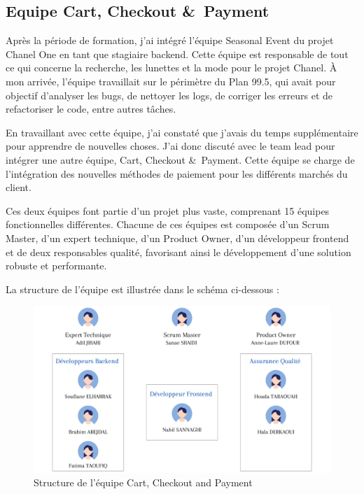 \subsection{Equipe Cart, Checkout \&\ Payment}

Après la période de formation, j'ai intégré l'équipe Seasonal Event du projet Chanel One en tant que stagiaire backend. Cette équipe est responsable de tout ce qui concerne la recherche, les lunettes et la mode pour le projet Chanel. À mon arrivée, l'équipe travaillait sur le périmètre du Plan 99.5, qui avait pour objectif d'analyser les bugs, de nettoyer les logs, de corriger les erreurs et de refactoriser le code, entre autres tâches.

En travaillant avec cette équipe, j'ai constaté que j'avais du temps supplémentaire pour apprendre de nouvelles choses. J'ai donc discuté avec le team lead pour intégrer une autre équipe, Cart, Checkout \&\ Payment. Cette équipe se charge de l'intégration des nouvelles méthodes de paiement pour les différents marchés du client.

Ces deux équipes font partie d'un projet plus vaste, comprenant 15 équipes fonctionnelles différentes. Chacune de ces équipes est composée d'un Scrum Master, d'un expert technique, d'un Product Owner, d'un développeur frontend et de deux responsables qualité, favorisant ainsi le développement d'une solution robuste et performante.

La structure de l'équipe est illustrée dans le schéma ci-dessous :


\begin{figure}[h]
    \centering
    \includegraphics[width=19cm]{Figures/Cart Checkout & Payment.png} %
    \caption{ Structure de l’équipe Cart, Checkout and Payment}
\end{figure}
